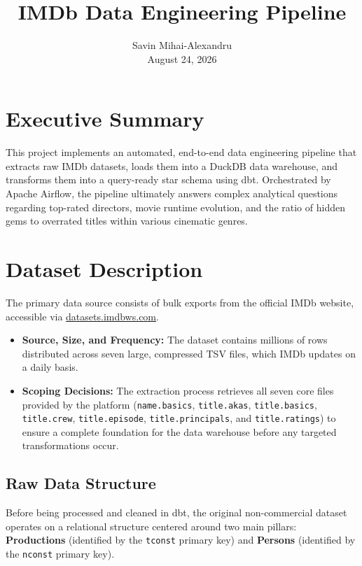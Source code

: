 \documentclass[runningheads]{llncs}
\begin{document}
\title{IMDb Data Engineering Pipeline}

\author{Savin Mihai-Alexandru \\ \vspace{0.1cm} \normalsize{August 24, 2026}}
\institute{}

\maketitle

\section{Executive Summary}
This project implements an automated, end-to-end data engineering pipeline that extracts raw IMDb datasets, loads them into a DuckDB data warehouse, and transforms them into a query-ready star schema using dbt. Orchestrated by Apache Airflow, the pipeline ultimately answers complex analytical questions regarding top-rated directors, movie runtime evolution, and the ratio of hidden gems to overrated titles within various cinematic genres.

\section{Dataset Description}
The primary data source consists of bulk exports from the official IMDb website, accessible via \url{datasets.imdbws.com}.

\begin{itemize}
    \item \textbf{Source, Size, and Frequency:} The dataset contains millions of rows distributed across seven large, compressed TSV files, which IMDb updates on a daily basis.
    \item \textbf{Scoping Decisions:} The extraction process retrieves all seven core files provided by the platform (\texttt{name.basics}, \texttt{title.akas}, \texttt{title.basics}, \texttt{title.crew}, \texttt{title.episode}, \texttt{title.principals}, and \texttt{title.ratings}) to ensure a complete foundation for the data warehouse before any targeted transformations occur.
\end{itemize}

\subsection{Raw Data Structure}
Before being processed and cleaned in dbt, the original non-commercial dataset operates on a relational structure centered around two main pillars: \textbf{Productions} (identified by the \texttt{tconst} primary key) and \textbf{Persons} (identified by the \texttt{nconst} primary key).
\end{document}
